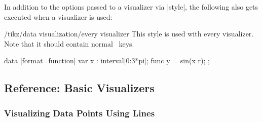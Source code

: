 In addition to the options passed to a visualizer via |style|, the
following also gets executed when a visualizer is used:

\begin{stylekey}{/tikz/data visualization/every visualizer}
  This style is used with every visualizer. Note that it should
  contain normal \tikzname\ keys.

\begin{codeexample}[width=7cm]
\tikz \datavisualization
 [scientific axes=clean,
  every visualizer/.style={dashed},
  visualize as smooth line]
data [format=function] {
  var x : interval[0:3*pi];
  func y = sin(\value x r);
};
\end{codeexample}
\end{stylekey}


\subsection{Reference: Basic Visualizers}

\subsubsection{Visualizing Data Points Using Lines}

